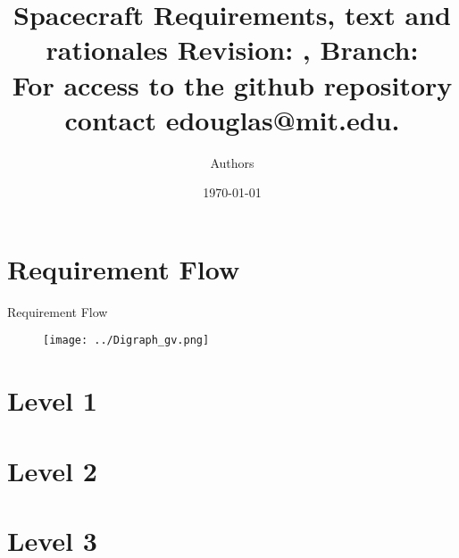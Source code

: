 \documentclass[9pt]{beamer}
\title{ Spacecraft Requirements, text and rationales
  \tiny{Revision: \gitDescribe, Branch: \gitBranch\\
    For access to the github repository contact edouglas@mit.edu.}}
\author{Authors}
\date{\today}
\begin{document}


\section{Requirement Flow}
\begin{frame}[shrink]{Requirement Flow}
\begin{figure}[htbp]
\begin{center}
\texttt{[image: ../Digraph\_gv.png]}
\label{default}
\end{center}
\end{figure}
\end{frame}


\frame{\titlepage}

\section[Outline]{}
\section{Level 1}

\section{Level 2}

\section{Level 3}

\end{document}
